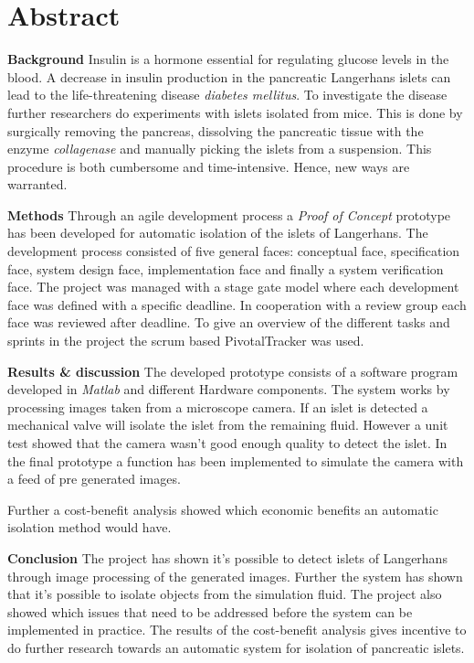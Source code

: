 \section*{Abstract}
\textbf{Background}
Insulin is a hormone essential for regulating glucose levels in the blood. A decrease in insulin production in the pancreatic Langerhans islets can lead to the life-threatening disease \textit{diabetes mellitus}. To investigate the disease further researchers do experiments with islets isolated from mice. This is done by surgically removing the pancreas, dissolving the pancreatic tissue with the enzyme \textit{collagenase} and manually picking the islets from a suspension. This procedure is both cumbersome and time-intensive. Hence, new ways are warranted.   

\textbf{Methods}
Through an agile development process a \textit{Proof of Concept} prototype has been developed for automatic isolation of the islets of Langerhans. The development process consisted of five general faces: conceptual face,  specification face, system design face, implementation face and finally a system verification face. The project was managed with a stage gate model where each development face was defined with a specific deadline. In cooperation with a review group each face was reviewed after deadline. To give an overview of the different tasks and sprints in the project the scrum based PivotalTracker was used.   


\textbf{Results \& discussion} The developed prototype consists of a software program developed in \textit{Matlab} and different Hardware components.  The system works by processing images taken from a microscope camera. If an islet is detected a mechanical valve will isolate the islet from the remaining fluid. However a unit test showed that the camera wasn't good enough quality to detect the islet. In the final prototype a function has been implemented to simulate the camera with a feed of pre generated images.

Further a cost-benefit analysis showed which economic benefits an automatic isolation method would have. 

\textbf{Conclusion}
The project has shown it's possible to detect islets of Langerhans through image processing of the generated images. Further the system has shown that it's possible to isolate objects from the simulation fluid. The project also showed which issues that need to be addressed before the system can be implemented in practice. The results of the cost-benefit analysis gives incentive to do further research towards an automatic system for isolation of pancreatic islets. 